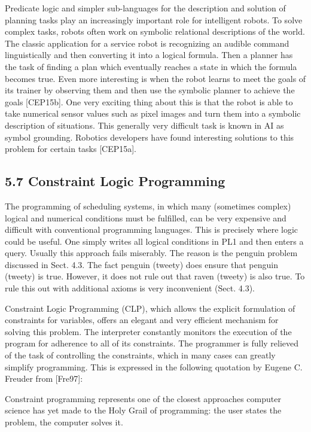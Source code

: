 \documentclass[10pt]{article}
\begin{document}
Predicate logic and simpler sub-languages for the description and solution of planning tasks play an increasingly important role for intelligent robots. To solve complex tasks, robots often work on symbolic relational descriptions of the world. The classic application for a service robot is recognizing an audible command linguistically and then converting it into a logical formula. Then a planner has the task of finding a plan which eventually reaches a state in which the formula becomes true. Even more interesting is when the robot learns to meet the goals of its trainer by observing them and then use the symbolic planner to achieve the goals [CEP15b]. One very exciting thing about this is that the robot is able to take numerical sensor values such as pixel images and turn them into a symbolic description of situations. This generally very difficult task is known in AI as symbol grounding. Robotics developers have found interesting solutions to this problem for certain tasks [CEP15a].

\subsection*{5.7 Constraint Logic Programming}
The programming of scheduling systems, in which many (sometimes complex) logical and numerical conditions must be fulfilled, can be very expensive and difficult with conventional programming languages. This is precisely where logic could be useful. One simply writes all logical conditions in PL1 and then enters a query. Usually this approach fails miserably. The reason is the penguin problem discussed in Sect. 4.3. The fact penguin (tweety) does ensure that penguin (tweety) is true. However, it does not rule out that raven (tweety) is also true. To rule this out with additional axioms is very inconvenient (Sect. 4.3).

Constraint Logic Programming (CLP), which allows the explicit formulation of constraints for variables, offers an elegant and very efficient mechanism for solving this problem. The interpreter constantly monitors the execution of the program for adherence to all of its constraints. The programmer is fully relieved of the task of controlling the constraints, which in many cases can greatly simplify programming. This is expressed in the following quotation by Eugene C. Freuder from [Fre97]:


\begin{displayquote}
Constraint programming represents one of the closest approaches computer science has yet made to the Holy Grail of programming: the user states the problem, the computer solves it.
\end{displayquote}
\end{document}
